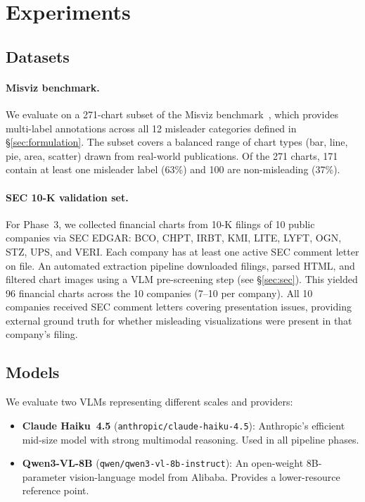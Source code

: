 \section{Experiments}
\label{sec:experiments}

\subsection{Datasets}
\label{sec:data}

\paragraph{Misviz benchmark.}
We evaluate on a 271-chart subset of the Misviz benchmark~\cite{tonglet2025misviz}, which provides multi-label annotations across all 12 misleader categories defined in \S\ref{sec:formulation}. The subset covers a balanced range of chart types (bar, line, pie, area, scatter) drawn from real-world publications. Of the 271 charts, 171 contain at least one misleader label (63\%) and 100 are non-misleading (37\%).

\paragraph{SEC 10-K validation set.}
For Phase~3, we collected financial charts from 10-K filings of 10 public companies via SEC EDGAR: BCO, CHPT, IRBT, KMI, LITE, LYFT, OGN, STZ, UPS, and VERI. Each company has at least one active SEC comment letter on file. An automated extraction pipeline downloaded filings, parsed HTML, and filtered chart images using a VLM pre-screening step (see \S\ref{sec:sec}). This yielded 96 financial charts across the 10 companies (7--10 per company). All 10 companies received SEC comment letters covering presentation issues, providing external ground truth for whether misleading visualizations were present in that company's filing.

\subsection{Models}
\label{sec:models}

We evaluate two VLMs representing different scales and providers:

\begin{itemize}[nosep]
  \item \textbf{Claude Haiku~4.5} (\texttt{anthropic/claude-haiku-4.5}): Anthropic's efficient mid-size model with strong multimodal reasoning. Used in all pipeline phases.
  \item \textbf{Qwen3-VL-8B} (\texttt{qwen/qwen3-vl-8b-instruct}): An open-weight 8B-parameter vision-language model from Alibaba. Provides a lower-resource reference point.
\end{itemize}

